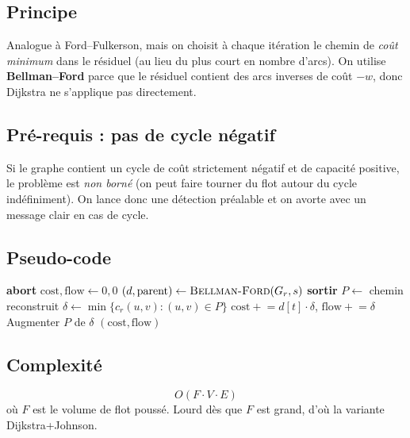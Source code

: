 \documentclass[11pt,a4paper]{article}
\newcommand{\Gres}{G_{r}}
\begin{document}
\subsection{Principe}

Analogue à Ford--Fulkerson, mais on choisit à chaque itération le chemin
de \emph{coût minimum} dans le résiduel (au lieu du plus court en
nombre d'arcs). On utilise \textbf{Bellman--Ford} parce que le résiduel
contient des arcs inverses de coût $-w$, donc Dijkstra ne s'applique pas
directement.

\subsection{Pré-requis : pas de cycle négatif}

Si le graphe contient un cycle de coût strictement négatif et de capacité
positive, le problème est \emph{non borné} (on peut faire tourner du flot
autour du cycle indéfiniment). On lance donc une détection préalable et
on avorte avec un message clair en cas de cycle.

\subsection{Pseudo-code}

\begin{algorithm}[H]
\caption{MCF par augmentations successives (Bellman--Ford)}
\begin{algorithmic}[1]
     \textbf{abort} \EndIf
    \State $\text{cost}, \text{flow} \gets 0, 0$
        \State $(d, \text{parent}) \gets \Call{Bellman-Ford}{\Gres, s}$
         \textbf{sortir} \EndIf
        \State $P \gets$ chemin reconstruit
        \State $\delta \gets \min\{c_r(u,v) : (u,v) \in P\}$
        \State $\text{cost} \mathrel{+}= d[t] \cdot \delta$, \quad $\text{flow} \mathrel{+}= \delta$
        \State Augmenter $P$ de $\delta$
    \EndWhile
    \State \Return $(\text{cost}, \text{flow})$
\EndFunction
\end{algorithmic}
\end{algorithm}

\subsection{Complexité}

\[
\boxed{\;O(F \cdot V \cdot E)\;}
\]
où $F$ est le volume de flot poussé. Lourd dès que $F$ est grand, d'où
la variante Dijkstra+Johnson.
\end{document}
